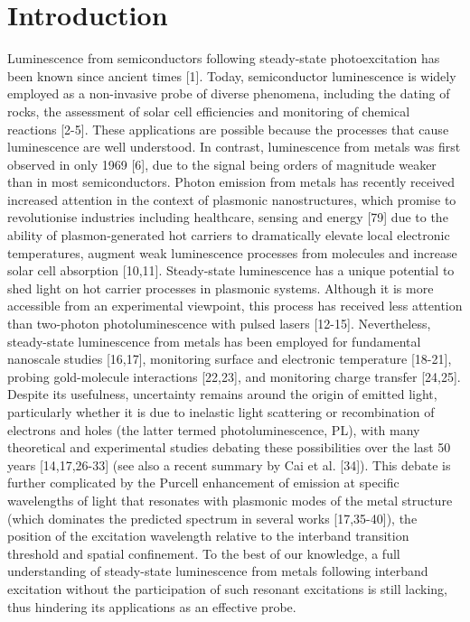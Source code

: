 \documentclass[10pt]{article}
\begin{document}
\section*{Introduction}
Luminescence from semiconductors following steady-state photoexcitation has been known since ancient times [1]. Today, semiconductor luminescence is widely employed as a non-invasive probe of diverse phenomena, including the dating of rocks, the assessment of solar cell efficiencies and monitoring of chemical reactions [2-5]. These applications are possible because the processes that cause luminescence are well understood. In contrast, luminescence from metals was first observed in only 1969 [6], due to the signal being orders of magnitude weaker than in most semiconductors. Photon emission from metals has recently received increased attention in the context of plasmonic nanostructures, which promise to revolutionise industries including healthcare, sensing and energy [79] due to the ability of plasmon-generated hot carriers to dramatically elevate local electronic temperatures, augment weak luminescence processes from molecules and increase solar cell absorption [10,11]. Steady-state luminescence has a unique potential to shed light on hot carrier processes in plasmonic systems. Although it is more accessible from an experimental viewpoint, this process has received less attention than two-photon photoluminescence with pulsed lasers [12-15]. Nevertheless, steady-state luminescence from metals has been employed for fundamental nanoscale studies [16,17], monitoring surface and electronic temperature [18-21], probing gold-molecule interactions [22,23], and monitoring charge transfer [24,25]. Despite its usefulness, uncertainty remains around the origin of emitted light, particularly whether it is due to inelastic light scattering or recombination of electrons and holes (the latter termed photoluminescence, PL), with many theoretical and experimental studies debating these possibilities over the last 50 years [14,17,26-33] (see also a recent summary by Cai et al. [34]). This debate is further complicated by the Purcell enhancement of emission at specific wavelengths of light that resonates with plasmonic modes of the metal structure (which dominates the predicted spectrum in several works [17,35-40]), the position of the excitation wavelength relative to the interband transition threshold and spatial confinement. To the best of our knowledge, a full understanding of steady-state luminescence from metals following interband excitation without the participation of such resonant excitations is still lacking, thus hindering its applications as an effective probe.
\end{document}
